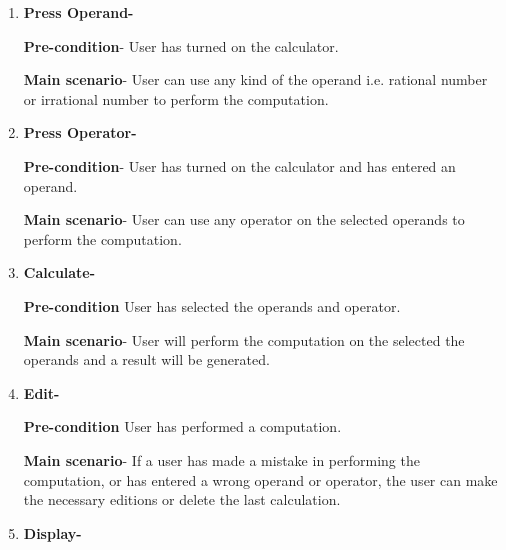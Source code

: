 \documentclass[12pt]{article}
\begin{document}
\vspace{\baselineskip}
\begin{enumerate}
	\item \textbf{Press Operand- }\par

\textbf{Pre-condition}- User has turned on the calculator.\par

\textbf{Main scenario}- User can use any kind of the operand i.e. rational number or irrational number to perform the computation.\par


\vspace{\baselineskip}

\vspace{\baselineskip}
	\item \textbf{Press Operator- }\par

\textbf{Pre-condition}- User has turned on the calculator and has entered an operand.\par

\textbf{Main scenario}- User can use any operator on the selected operands to perform the computation.\par

	\item \textbf{Calculate- }\par

\textbf{Pre-condition} User has selected the operands and operator.\par

\textbf{Main scenario}- User will perform the computation on the selected the operands and a result will be generated.\par

	\item \textbf{Edit- }\par

\textbf{Pre-condition} User has performed a computation.\par

\textbf{Main scenario}- If a user has made a mistake in performing the computation, or has entered a wrong operand or operator, the user can make the necessary editions or delete the last calculation.\par

	\item \textbf{Display- }
\end{enumerate}\par
\end{document}
